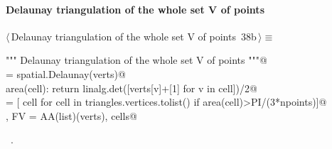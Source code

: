 \documentclass[11pt,oneside]{article}    %
\begin{document}
\paragraph{Delaunay triangulation of the whole set V of points}
\begin{flushleft} \small \label{scrap61}
\protect{}$\langle\,$Delaunay triangulation of the whole set V of points\nobreak\ {\footnotesize 38b}$\,\rangle\equiv$
\vspace{-1ex}
\begin{list}{}{} \item
\mbox{}\verb@""" Delaunay triangulation of the whole set V of points """@\\
\mbox{}\verb@triangles = spatial.Delaunay(verts)@\\
\mbox{}\verb@def area(cell): return linalg.det([verts[v]+[1] for v in cell])/2@\\
\mbox{}\verb@cells = [ cell for cell in triangles.vertices.tolist() if area(cell)>PI/(3*npoints)]@\\
\mbox{}\verb@V, FV = AA(list)(verts), cells@\\
\mbox{}\verb@@{\NWsep}
\end{list}
\vspace{-1ex}
\footnotesize\addtolength{\baselineskip}{-1ex}
\begin{list}{}{\setlength{\itemsep}{-\parsep}\setlength{\itemindent}{-\leftmargin}}
\item \NWtxtMacroRefIn\ .
\end{list}
\end{flushleft}
\end{document}
